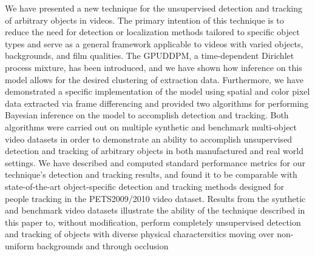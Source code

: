 \documentclass[smallcondensed, final]{svjour3}
\begin{document}
We have presented a new technique for the unsupervised detection and tracking of arbitrary objects in videos. The primary intention of this technique is to reduce the need for detection or localization methods tailored to specific object types and serve as a general framework applicable to videos with varied objects, backgrounds, and film qualities. The GPUDDPM, a time-dependent Dirichlet process mixture, has been introduced, and we have shown how inference on this model allows for the desired clustering of extraction data. Furthermore, we have demonstrated a specific implementation of the model using spatial and color pixel data extracted via frame differencing and provided two algorithms for performing Bayesian inference on the model to accomplish detection and tracking. Both algorithms were carried out on multiple synthetic and benchmark multi-object video datasets in order to demonstrate an ability to accomplish unsupervised detection and tracking of arbitrary objects in both manufactured and real world settings. We have described and computed standard performance metrics for our technique's detection and tracking results, and found it to be comparable with state-of-the-art object-specific detection and tracking methods designed for people tracking in the PETS2009/2010 video dataset. Results from the synthetic and benchmark video datasets illustrate the ability of the technique described in this paper to, without modification, perform completely unsupervised detection and tracking of objects with diverse physical charactersitics moving over non-uniform backgrounds and through occlusion




















\begin{small}

 
\end{small}
\end{document}
